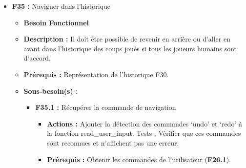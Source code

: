 \documentclass{article}
\begin{document}
\begin{itemize}
\begin{itemize}
\begin{itemize}
            \begin{itemize}
                \item \textbf{Description :} Lors de la navigation dans un historique de coup, l’utilisateur peut entrer ‘start’, pour recommencer une partie à partir de ce coup moyennant une confirmation.
                \item \textbf{Prérequis :} Gameloop, main, etc. (\textbf{F61}).
                \item \textbf{Actions :} Ajouter ‘start’ aux commandes de replay\_mode\_user\_input. Utiliser \textit{confirm} pour l’accord du joueur. Si oui, cela rebascule le jeu sur la boucle principale et vide l’historique des coups annulés, on continue le mode replay sinon.
                \item \textbf{Tests :} Créer un historique de coup à partir d’une partie. Charger la partie à partir de l’avant-dernier coup, annuler le dernier coup sur le plateau d’origine, les plateaux doivent alors être identiques.
            \end{itemize}
        \end{itemize}
    \end{itemize}
\bigskip
    \item \textbf{F35 :} Naviguer dans l’historique
    \begin{itemize}
        \item \textbf{Besoin Fonctionnel}
        \item \textbf{Description :} Il doit être possible de revenir en arrière ou d’aller en avant dans l’historique des coups joués si tous les joueurs humains sont d’accord.
        \item \textbf{Prérequis :} Représentation de l’historique {F30}.
        \item \textbf{Sous-besoin(s) :}
        \begin{itemize}
            \smallskip
            \item \textbf{F35.1 :} Récupérer la commande de navigation
            \begin{itemize}
                \item \textbf{Actions :} Ajouter la détection des commandes ‘undo’ et ‘redo’ à la fonction read\_user\_input.
                Tests : Vérifier que ces commandes sont reconnues et n’affichent pas une erreur.
                \item \textbf{Prérequis :} Obtenir les commandes de l’utilisateur (\textbf{F26.1}).
            \end{itemize}

\end{itemize}
\end{itemize}
\end{itemize}
\end{document}
